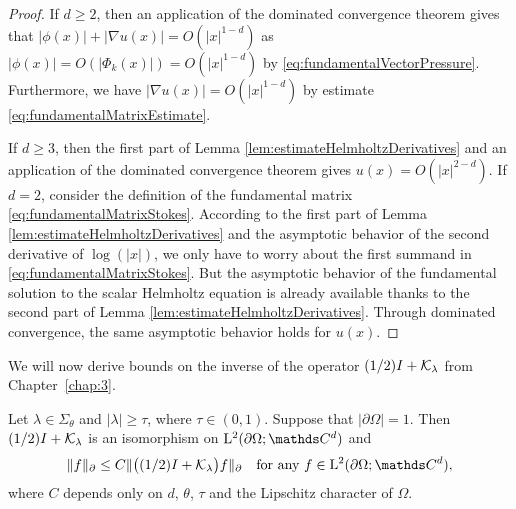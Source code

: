 \begin{proof}
  If $d \geq 2$, then an application of the dominated convergence theorem gives that $|\phi(x)| + |\nabla u(x)| = O(|x|^{1 - d})$ as $|\phi(x)| = O(|\Phi_k(x)|) = O(|x|^{1 - d})$ by \eqref{eq:fundamentalVectorPressure}.
 Furthermore, we have $|\nabla u(x)| = O(|x|^{1 - d})$ by estimate \eqref{eq:fundamentalMatrixEstimate}.

  If $d \geq 3$, then the first part of Lemma \ref{lem:estimateHelmholtzDerivatives} and an application of the dominated convergence theorem gives $u(x) = O(|x|^{2 - d})$.
  If $d = 2$, consider the definition of the fundamental matrix \eqref{eq:fundamentalMatrixStokes}. According to the first part of Lemma \ref{lem:estimateHelmholtzDerivatives} and the asymptotic behavior of the second derivative of $\log(|x|)$, we only have to worry about the first summand in \eqref{eq:fundamentalMatrixStokes}. 
  But the asymptotic behavior of the fundamental solution to the scalar Helmholtz equation is already available thanks to the second part of Lemma \ref{lem:estimateHelmholtzDerivatives}. 
  Through dominated convergence, the same asymptotic behavior holds for $u(x)$.
\end{proof}

We will now derive bounds on the inverse of the operator $(1/2) I + \mathcal{K}_\lambda$ from Chapter~\ref{chap:3}. 

\begin{lem}
  Let $\lambda \in \Sigma_\theta$ and $|\lambda| \geq \tau$, where $\tau \in (0,1)$.
  Suppose that $|\partial\Omega| = 1$.
  Then $(1/2)I + \mathcal{K}_\lambda$ is an isomorphism on $\Ell^2(\partial\Omega; \C^d)$ and
  \begin{align}
    \label{eq:inverseEstimate}
    \| f\|_\partial \leq C \|\big( (1/2) I + \K_\lambda \big) f \|_\partial \quad\text{for any } f \in \Ell^2(\partial\Omega; \C^d),
  \end{align}
  where $C$ depends only on $d$, $\theta$, $\tau$ and the Lipschitz character of $\Omega$.
\end{lem}

